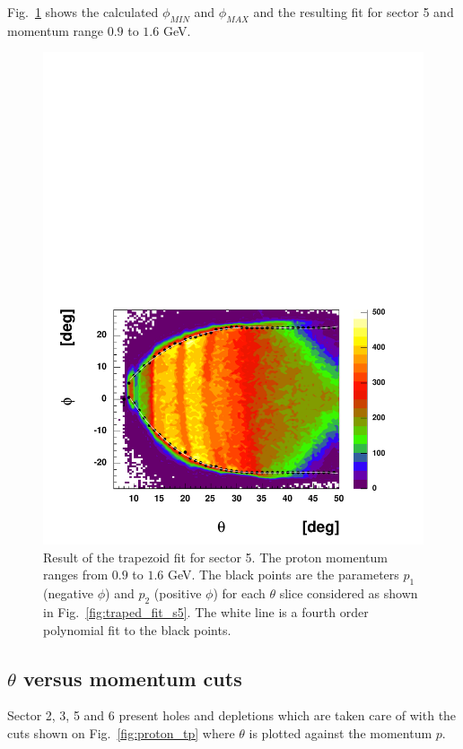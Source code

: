 Fig.~\ref{fig:traped_fit_result_s5} shows the calculated $\phi_{MIN}$ and $\phi_{MAX}$  and the resulting fit
for sector 5 and momentum range $0.9$ to $1.6$ GeV.

\begin{figure}[h]
 \begin{center}
 \includegraphics[width = 13cm, bb=0 0 580 430]{img/traped_fit_result_s5}
  \caption[Result of the trapezoid fit]
          { Result of the trapezoid fit for sector 5. The proton momentum ranges from $0.9$
	             to $1.6$ GeV.
	             The black points are the parameters $p_1$ (negative $\phi$) and $p_2$ (positive $\phi$)
                     for each $\theta$ slice considered as shown in Fig.~\ref{fig:traped_fit_s5}.
		     The white line is a fourth order polynomial fit to the black points.}
 \label{fig:traped_fit_result_s5}
 \end{center}
\end{figure}

\subsection{ $\theta$ versus momentum cuts}
Sector 2, 3, 5 and 6 present holes and depletions which are taken care of with the
cuts shown on Fig.~\ref{fig:proton_tp} where $\theta$ is plotted against the momentum $p$.

